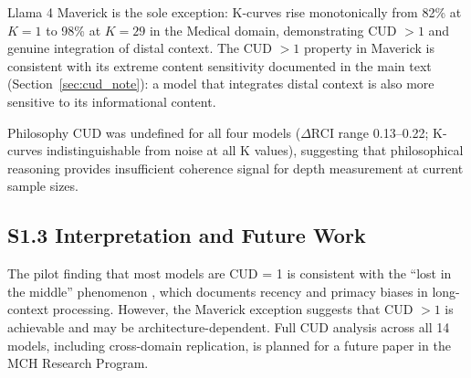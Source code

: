 \documentclass[11pt,a4paper]{article}
\begin{document}
Llama 4 Maverick is the sole exception: K-curves rise monotonically from 82\% at $K = 1$ to 98\% at $K = 29$ in the Medical domain, demonstrating CUD $> 1$ and genuine integration of distal context. The CUD $> 1$ property in Maverick is consistent with its extreme content sensitivity documented in the main text (Section~\ref{sec:cud_note}): a model that integrates distal context is also more sensitive to its informational content.

Philosophy CUD was undefined for all four models ($\Delta$RCI range 0.13--0.22; K-curves indistinguishable from noise at all K values), suggesting that philosophical reasoning provides insufficient coherence signal for depth measurement at current sample sizes.

\subsection*{S1.3 Interpretation and Future Work}

The pilot finding that most models are CUD = 1 is consistent with the ``lost in the middle'' phenomenon \citep{liu2024lost}, which documents recency and primacy biases in long-context processing. However, the Maverick exception suggests that CUD $> 1$ is achievable and may be architecture-dependent. Full CUD analysis across all 14 models, including cross-domain replication, is planned for a future paper in the MCH Research Program.
\end{document}
